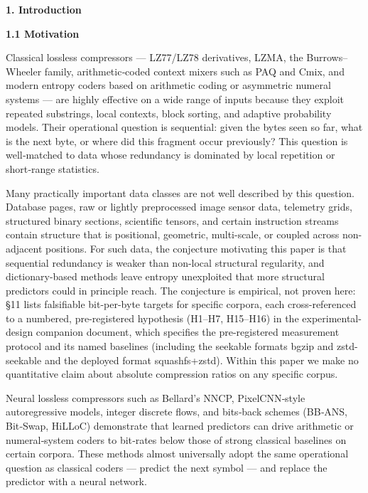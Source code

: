 \documentclass[
]{article}
\begin{document}
\textbf{1. Introduction}

\textbf{1.1 Motivation}

Classical lossless compressors --- LZ77/LZ78 derivatives, LZMA, the
Burrows--Wheeler family, arithmetic‑coded context mixers such as PAQ and
Cmix, and modern entropy coders based on arithmetic coding or asymmetric
numeral systems --- are highly effective on a wide range of inputs
because they exploit repeated substrings, local contexts, block sorting,
and adaptive probability models. Their operational question is
sequential: given the bytes seen so far, what is the next byte, or where
did this fragment occur previously? This question is well‑matched to
data whose redundancy is dominated by local repetition or short‑range
statistics.

Many practically important data classes are not well described by this
question. Database pages, raw or lightly preprocessed image sensor data,
telemetry grids, structured binary sections, scientific tensors, and
certain instruction streams contain structure that is positional,
geometric, multi-scale, or coupled across non-adjacent positions. For
such data, the conjecture motivating this paper is that sequential
redundancy is weaker than non-local structural regularity, and
dictionary-based methods leave entropy unexploited that more structural
predictors could in principle reach. The conjecture is empirical, not
proven here: §11 lists falsifiable bit-per-byte targets for specific
corpora, each cross-referenced to a numbered, pre-registered hypothesis
(H1--H7, H15--H16) in the experimental-design companion document, which
specifies the pre-registered measurement protocol and its named
baselines (including the seekable formats bgzip and zstd-seekable and
the deployed format squashfs+zstd). Within this paper we make no
quantitative claim about absolute compression ratios on any specific
corpus.

Neural lossless compressors such as Bellard's NNCP, PixelCNN‑style
autoregressive models, integer discrete flows, and bits‑back schemes
(BB‑ANS, Bit‑Swap, HiLLoC) demonstrate that learned predictors can drive
arithmetic or numeral‑system coders to bit‑rates below those of strong
classical baselines on certain corpora. These methods almost universally
adopt the same operational question as classical coders --- predict the
next symbol --- and replace the predictor with a neural network.
\end{document}
